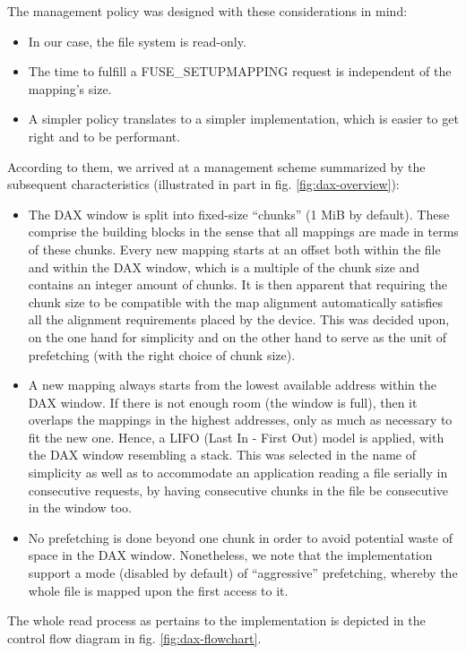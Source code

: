 The management policy was designed with these considerations in mind:
\begin{itemize}
    \item In our case, the file system is read-only.
    \item The time to fulfill a FUSE\_SETUPMAPPING request is independent of the
          mapping's size.
    \item A simpler policy translates to a simpler implementation, which is
          easier to get right and to be performant.
\end{itemize}
According to them, we arrived at a management scheme summarized by the
subsequent characteristics (illustrated in part in fig. \ref{fig:dax-overview}):
\begin{itemize}
    \item The DAX window is split into fixed-size ``chunks'' (1 MiB by default).
          These comprise the building blocks in the sense that all mappings are
          made in terms of these chunks. Every new mapping starts at an offset
          both within the file and within the DAX window, which is a multiple of
          the chunk size and contains an integer amount of chunks. It is then
          apparent that requiring the chunk size to be compatible with the map
          alignment automatically satisfies all the alignment requirements
          placed by the \viofs{} device. This was decided upon, on the one hand
          for simplicity and on the other hand to serve as the unit of
          prefetching (with the right choice of chunk size).
    \item A new mapping always starts from the lowest available address within
          the DAX window. If there is not enough room (the window is full), then
          it overlaps the mappings in the highest addresses, only as much as
          necessary to fit the new one. Hence, a LIFO (Last In - First Out)
          model is applied, with the DAX window resembling a stack. This was
          selected in the name of simplicity as well as to accommodate an
          application reading a file serially in consecutive requests, by having
          consecutive chunks in the file be consecutive in the window too.
    \item No prefetching is done beyond one chunk in order to avoid potential
          waste of space in the DAX window. Nonetheless, we note that the
          implementation support a mode (disabled by default) of ``aggressive''
          prefetching, whereby the whole file is mapped upon the first access to
          it.
\end{itemize}
The whole read process as pertains to the \viofs{} implementation is depicted
in the control flow diagram in fig. \ref{fig:dax-flowchart}.


